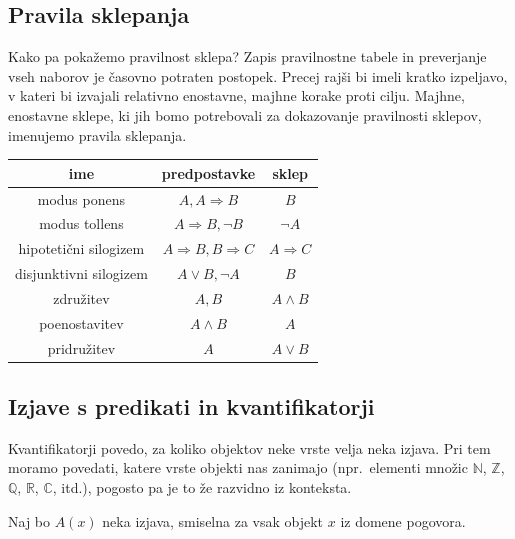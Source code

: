 \documentclass[12pt,a4paper]{article}
\begin{document}
\subsection{Pravila sklepanja}
Kako pa pokažemo pravilnost sklepa? Zapis
pravilnostne tabele in preverjanje vseh naborov je časovno potraten postopek. Precej
rajši bi imeli kratko izpeljavo, v kateri bi izvajali relativno enostavne, majhne korake
proti cilju.
Majhne, enostavne sklepe, ki jih bomo potrebovali za dokazovanje pravilnosti sklepov,
imenujemo pravila sklepanja.

\begin{tabular}{|c|c|c|}
	\hline 
	ime & predpostavke & sklep\\
	\hline 
	\hline 
	modus ponens & $A,A\Rightarrow B$ & $B$\\
	\hline 
	modus tollens & $A\Rightarrow B,\neg B$ & $\neg A$\\
	\hline 
	hipoteti\v{c}ni silogizem & $A\Rightarrow B,B\Rightarrow C$ & $A\Rightarrow C$\\
	\hline 
	disjunktivni silogizem & $A\vee B,\neg A$ & $B$\\
	\hline 
	združitev  & $A,B$ & $A\wedge B$\\
	\hline 
	poenostavitev & $A\wedge B$ & $A$\\
	\hline 
	pridružitev & $A$ & $A\vee B$\\
	\hline 
\end{tabular}

{
\subsection{Izjave s predikati in kvantifikatorji}
}

Kvantifikatorji povedo, za koliko objektov neke vrste velja neka izjava.
Pri tem moramo povedati, katere vrste objekti nas zanimajo (npr.~elementi množic $\mathbb{N}$, $\mathbb{Z}$, $\mathbb{Q}$, $\mathbb{R}$, $\mathbb{C}$, itd.), pogosto pa je to že razvidno iz konteksta.

Naj bo $A(x)$ neka izjava, smiselna za vsak objekt $x$ iz domene pogovora.
\iftoggle{long}{
{\color{blue}Taki izjavi pravimo {\it predikat}.
Predikati oblike $A(x)$ so enomestni. Poznamo pa tudi dvo- in večmestne predikate, npr.~$A(x,y)$, $P(x_1,x_2,x_3)$ ipd.}
}
{Taki izjavi pravimo {\it predikat}. Predikati oblike $A(x)$ so enomestni. Poznamo pa tudi dvo- in večmestne predikate, npr.~$A(x,y)$, $P(x_1,x_2,x_3)$ ipd.}
\end{document}
